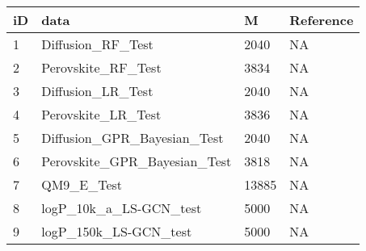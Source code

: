 
\begin{tabular}{l|l|l|l}
\hline
iD & data & M & Reference\\
\hline
1 & Diffusion\_RF\_Test & 2040 & NA\\
\hline
2 & Perovskite\_RF\_Test & 3834 & NA\\
\hline
3 & Diffusion\_LR\_Test & 2040 & NA\\
\hline
4 & Perovskite\_LR\_Test & 3836 & NA\\
\hline
5 & Diffusion\_GPR\_Bayesian\_Test & 2040 & NA\\
\hline
6 & Perovskite\_GPR\_Bayesian\_Test & 3818 & NA\\
\hline
7 & QM9\_E\_Test & 13885 & NA\\
\hline
8 & logP\_10k\_a\_LS-GCN\_test & 5000 & NA\\
\hline
9 & logP\_150k\_LS-GCN\_test & 5000 & NA\\
\hline
\end{tabular}
